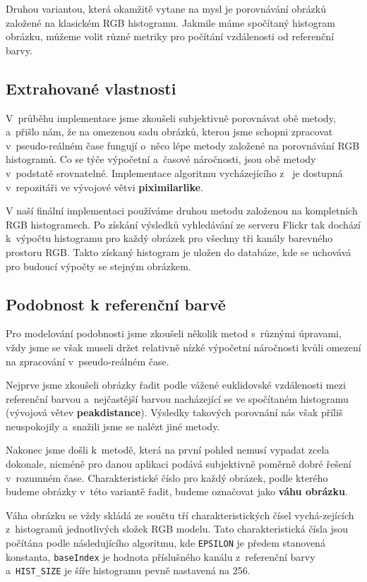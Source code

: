 \documentclass[12pt,oneside,a4paper]{article}
\begin{document}
Druhou variantou, která okamžitě vytane na mysl je porovnávání obrázků založené na klasickém RGB histogramu. Jakmile máme spočítaný histogram obrázku, můžeme volit různé metriky pro počítání vzdálenosti od referenční barvy.

\subsection{Extrahované vlastnosti}

V~průběhu implementace jsme zkoušeli subjektivně porovnávat obě metody, a~přišlo nám, že na omezenou sadu obrázků, kterou jsme schopni zpracovat v~pseudo-reálném čase fungují o~něco lépe metody založené na porovnávání RGB histogramů. Co se týče výpočetní a~časové náročnosti, jsou obě metody v~podstatě srovnatelné. Implementace algoritmu vycházejícího z~\cite{Mueller2k9} je dostupná v~repozitáři \cite{official} ve vývojové větvi \textbf{piximilarlike}.

V naší finální implementaci používáme druhou metodu založenou na kompletních RGB histogramech. Po získání výsledků vyhledávání ze serveru Flickr tak dochází k~výpočtu histogramu pro každý obrázek pro všechny tři kanály barevného prostoru RGB. Takto získaný histogram je uložen do databáze, kde se uchovává pro budoucí výpočty se stejným obrázkem.

\subsection{Podobnost k referenční barvě}
\label{sec:podobnost}

Pro modelování podobnosti jsme zkoušeli několik metod s~různými úpravami, vždy jsme se však museli držet relativně nízké výpočetní náročnosti kvůli omezení na zpracování v~pseudo-reálném čase.

Nejprve jsme zkoušeli obrázky řadit podle vážené euklidovské vzdálenosti mezi referenční barvou a~nejčastější barvou nacházející se ve spočítaném histogramu (vývojová větev \textbf{peakdistance}). Výsledky takových porovnání nás však příliš neuspokojily a~snažili jsme se nalézt jiné metody.

Nakonec jsme došli k~metodě, která na první pohled nemusí vypadat zcela dokonale, nicméně pro danou aplikaci podává subjektivně poměrně dobré řešení v~rozumném čase. Charakteristické číslo pro každý obrázek, podle kterého budeme obrázky v~této variantě řadit, budeme označovat jako \textbf{váhu obrázku}.

Váha obrázku se vždy skládá ze součtu tří charakteristických čísel vychá-zejících z~histogramů jednotlivých složek RGB modelu. Tato charakteristická čísla jsou počítána podle následujícího algoritmu, kde \texttt{EPSILON} je předem stanovená konstanta, \texttt{baseIndex} je hodnota příslušného kanálu z~referenční barvy a~\texttt{HIST\_SIZE} je šíře histogramu pevně nastavená na 256.
\end{document}
